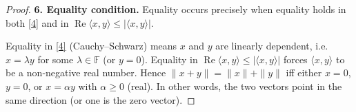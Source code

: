 \begin{proof}
\medskip\noindent\textbf{6. Equality condition.}  
Equality occurs precisely when equality holds in both \eqref{4} and in $\operatorname{Re}\langle x,y\rangle\le|\langle x,y\rangle|$.

Equality in \eqref{4} (Cauchy–Schwarz) means $x$ and $y$ are linearly dependent, i.e. $x=\lambda y$ for some $\lambda\in\mathbb{F}$ (or $y=0$).  
Equality in $\operatorname{Re}\langle x,y\rangle\le|\langle x,y\rangle|$ forces $\langle x,y\rangle$ to be a non‑negative real number.  
Hence $\|x+y\|=\|x\|+\|y\|$ iff either $x=0$, $y=0$, or $x=\alpha y$ with $\alpha\ge0$ (real). In other words, the two vectors point in the same direction (or one is the zero vector).
\end{proof}